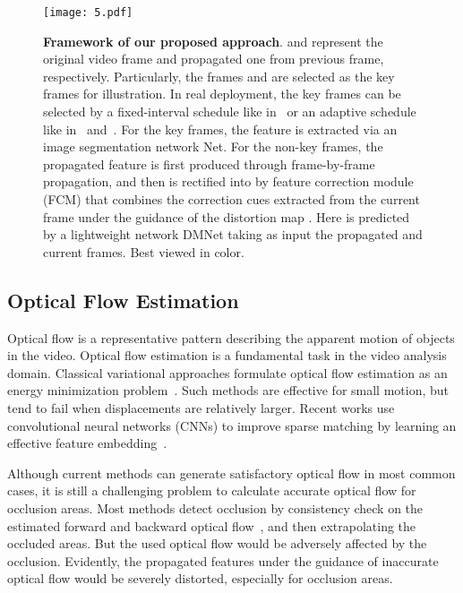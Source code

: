 \documentclass[journal]{IEEEtran}
\begin{document}
\begin{figure*}[t]
	\begin{center}
		\texttt{[image: 5.pdf]}
	\end{center}
	\caption{\textbf{Framework of our proposed approach}.  and  represent the original video frame and propagated one from previous frame, respectively. Particularly, the frames  and  are selected as the key frames for illustration. In real deployment, the key frames can be selected by a fixed-interval schedule like in~\cite{zhu2017deep} or an adaptive schedule like in~\cite{xu2018dynamic} and~\cite{li2018low}. For the key frames, the feature  is extracted via an image segmentation network Net. For the non-key frames, the propagated feature  is first produced through frame-by-frame propagation, and then is rectified into  by feature correction module (FCM) that combines the correction cues extracted from the current frame under the guidance of the distortion map . Here  is predicted by a lightweight network DMNet taking as input the propagated and current frames. Best viewed in color.}
	\label{framework}
\end{figure*}

\subsection{Optical Flow Estimation}
Optical flow is a representative pattern describing the apparent motion of objects in the video. Optical flow estimation is a fundamental task in the video analysis domain. Classical variational approaches formulate optical flow estimation as an energy minimization problem~\cite{horn1981determining,anguita2009optimization}. Such methods are effective for small motion, but tend to fail when displacements are relatively larger. Recent works use convolutional neural networks (CNNs) to improve sparse matching by learning an effective feature embedding~\cite{dosovitskiy2015flownet,ilg2017flownet,sun2018pwc,zhai2019optical}. 

Although current methods can generate satisfactory optical flow in most common cases, it is still a challenging problem to calculate accurate optical flow for occlusion areas. Most methods detect occlusion by consistency check on the estimated forward and backward optical flow~\cite{chen2016full,sundaram2010dense}, and then extrapolating the occluded areas. But the used optical flow would be adversely affected by the occlusion. Evidently, the propagated features under the guidance of inaccurate optical flow would be severely distorted, especially for occlusion areas. 
\end{document}
